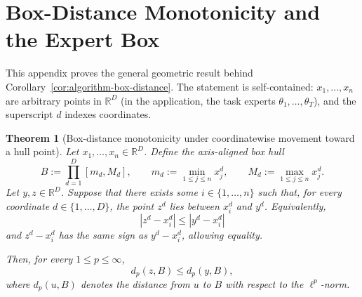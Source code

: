 \documentclass[11pt]{article}
\newtheorem{theorem}{Theorem}
\begin{document}
\appendix

\section{Box-Distance Monotonicity and the Expert Box}
\label{app:box-theory}

This appendix proves the general geometric result behind
Corollary~\ref{cor:algorithm-box-distance}. The statement is
self-contained: $x_1,\dots,x_n$ are arbitrary points in $\mathbb{R}^D$
(in the application, the task experts $\theta_1,\dots,\theta_T$), and the
superscript $d$ indexes coordinates.

\begin{theorem}[Box-distance monotonicity under coordinatewise movement toward a hull point]
\label{thm:box-distance-monotonicity}
Let \(x_1,\dots,x_n\in \mathbb{R}^D\). Define the axis-aligned box hull
\[
B:=\prod_{d=1}^D [m_d,M_d],
\qquad
m_d:=\min_{1\le j\le n} x_j^d,
\qquad
M_d:=\max_{1\le j\le n} x_j^d.
\]
Let \(y,z\in \mathbb{R}^D\). Suppose that there exists some
\(i\in\{1,\dots,n\}\) such that, for every coordinate \(d\in\{1,\dots,D\}\),
the point \(z^d\) lies between \(x_i^d\) and \(y^d\). Equivalently,
\[
|z^d-x_i^d|\le |y^d-x_i^d|
\]
and \(z^d-x_i^d\) has the same sign as \(y^d-x_i^d\), allowing equality.

Then, for every \(1\le p\le \infty\),
\[
d_p(z,B)\le d_p(y,B),
\]
where \(d_p(u,B)\) denotes the distance from \(u\) to \(B\) with respect to
the \(\ell^p\)-norm.
\end{theorem}
\end{document}
